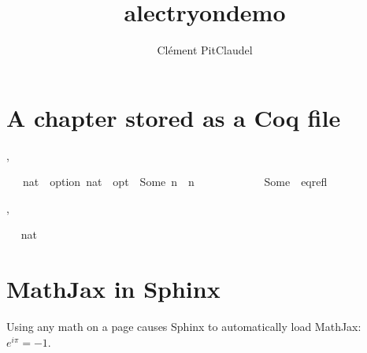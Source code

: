 \documentclass[letterpaper,10pt,english]{sphinxmanual}
\title{alectryon\sphinxhyphen{}demo}
\date{ }
\author{Clément Pit\sphinxhyphen{}Claudel}
\begin{document}
\pagestyle{empty}
\sphinxmaketitle
\pagestyle{plain}
\sphinxtableofcontents
\pagestyle{normal}
\label{\detokenize{index::doc}}



\chapter{A chapter stored as a Coq file}
\label{\detokenize{coqchapter:a-chapter-stored-as-a-coq-file}}\label{\detokenize{coqchapter::doc}}
\begin{alectryon}
  \sep
  \begin{sentence}
    \begin{input}
      ~~~nat~~option~nat~~opt~~Some~n~~n\nl
      ~~~~~~~~~~~\PYGZus{}~Some~~eq\PYGZus{}refl
    \end{input}
    \sep
    \begin{output}
      \begin{messages}
        \begin{message}
          ~\nl
          ~nat
        \end{message}
      \end{messages}
    \end{output}
  \end{sentence}
\end{alectryon}


\chapter{MathJax in Sphinx}
\label{\detokenize{math:mathjax-in-sphinx}}\label{\detokenize{math::doc}}
\sphinxAtStartPar
Using any math on a page causes Sphinx to automatically load MathJax: \(e^{i\pi} = -1\).
\end{document}
